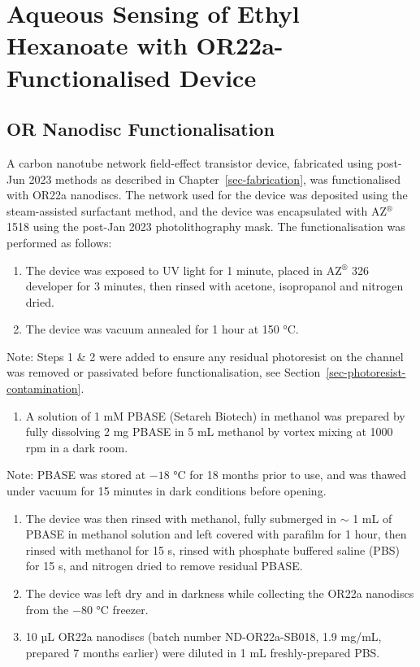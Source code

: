 \documentclass[
  a4paper,
]{scrbook}
\providecommand{\tightlist}{%
  \setlength{\itemsep}{0pt}\setlength{\parskip}{0pt}}\usepackage{longtable,booktabs,array}
\begin{document}
\hypertarget{sec-aqueous-sensing-EtHex}{%
\section{Aqueous Sensing of Ethyl Hexanoate with OR22a-Functionalised
Device}\label{sec-aqueous-sensing-EtHex}}

\hypertarget{sec-working-PBASE-functionalisation}{%
\subsection{OR Nanodisc
Functionalisation}\label{sec-working-PBASE-functionalisation}}

A carbon nanotube network field-effect transistor device, fabricated
using post-Jun 2023 methods as described in
Chapter~\ref{sec-fabrication}, was functionalised with OR22a nanodiscs.
The network used for the device was deposited using the steam-assisted
surfactant method, and the device was encapsulated with AZ\(^\circledR\)
1518 using the post-Jan 2023 photolithography mask. The
functionalisation was performed as follows:

\begin{enumerate}
\def\labelenumi{\arabic{enumi}.}
\item
  The device was exposed to UV light for 1 minute, placed in
  AZ\(^\circledR\) 326 developer for 3 minutes, then rinsed with
  acetone, isopropanol and nitrogen dried.
\item
  The device was vacuum annealed for 1 hour at 150 °C.
\end{enumerate}

Note: Steps 1 \& 2 were added to ensure any residual photoresist on the
channel was removed or passivated before functionalisation, see
Section~\ref{sec-photoresist-contamination}.

\begin{enumerate}
\def\labelenumi{\arabic{enumi}.}
\setcounter{enumi}{2}
\tightlist
\item
  A solution of 1 mM PBASE (Setareh Biotech) in methanol was prepared by
  fully dissolving 2 mg PBASE in 5 mL methanol by vortex mixing at 1000
  rpm in a dark room.
\end{enumerate}

Note: PBASE was stored at \(-18\) °C for 18 months prior to use, and was
thawed under vacuum for 15 minutes in dark conditions before opening.

\begin{enumerate}
\def\labelenumi{\arabic{enumi}.}
\setcounter{enumi}{3}
\item
  The device was then rinsed with methanol, fully submerged in \(\sim\)
  1 mL of PBASE in methanol solution and left covered with parafilm for
  1 hour, then rinsed with methanol for 15 s, rinsed with phosphate
  buffered saline (PBS) for 15 s, and nitrogen dried to remove residual
  PBASE.
\item
  The device was left dry and in darkness while collecting the OR22a
  nanodiscs from the \(-80\) °C freezer.
\item
  10 µL OR22a nanodiscs (batch number ND-OR22a-SB018, 1.9 mg/mL,
  prepared 7 months earlier) were diluted in 1 mL freshly-prepared PBS.
\end{enumerate}
\end{document}
